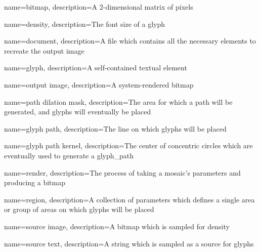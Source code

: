 {
  name={bitmap},
  description={A 2-dimensional matrix of pixels}
}

{
  name={density},
  description={The font size of a \gls{glyph}}
}

{
  name={document},
  description={A file which contains all the necessary elements to recreate the output image}
}

{
  name={glyph},
  description={A self-contained textual element}
}

{
  name={output image},
  description={A system-rendered bitmap}
}

{
  name={path dilation mask},
  description={The area for which a path will be generated, and glyphs will eventually be placed}
}

{
  name={glyph path},
  description={The line on which glyphs will be placed}
}

{
  name={glyph path kernel},
  description={The center of concentric circles which are eventually used to generate a \gls{glyph_path}}
}

{
  name={render},
  description={The process of taking a mosaic's parameters and producing a bitmap}
}

{
  name={region},
  description={A collection of parameters which defines a single area or group of areas on which glyphs will be placed}
}

{
  name={source image},
  description={A \gls{bitmap} which is sampled for \gls{density}}
}

{
  name={source text},
  description={A string which is sampled as a source for glyphs}
}